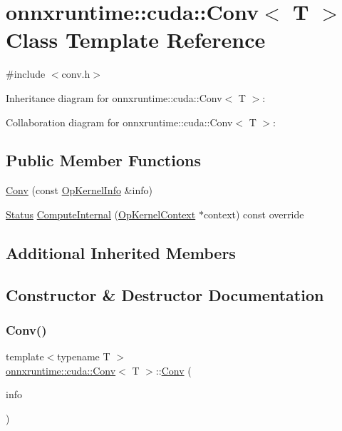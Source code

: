 \hypertarget{classonnxruntime_1_1cuda_1_1Conv}{}\section{onnxruntime\+:\+:cuda\+:\+:Conv$<$ T $>$ Class Template Reference}
\label{classonnxruntime_1_1cuda_1_1Conv}


{\ttfamily \#include $<$conv.\+h$>$}



Inheritance diagram for onnxruntime\+:\+:cuda\+:\+:Conv$<$ T $>$\+:


Collaboration diagram for onnxruntime\+:\+:cuda\+:\+:Conv$<$ T $>$\+:
\subsection*{Public Member Functions}
\begin{DoxyCompactItemize}
\item 
\mbox{\hyperlink{classonnxruntime_1_1cuda_1_1Conv_abd46baacce418318b12d2004d2658a7b}{Conv}} (const \mbox{\hyperlink{classonnxruntime_1_1OpKernelInfo}{Op\+Kernel\+Info}} \&info)
\item 
\mbox{\hyperlink{classonnxruntime_1_1common_1_1Status}{Status}} \mbox{\hyperlink{classonnxruntime_1_1cuda_1_1Conv_a01a9b9a3a511fe197e7bb92685f50e8e}{Compute\+Internal}} (\mbox{\hyperlink{classonnxruntime_1_1OpKernelContext}{Op\+Kernel\+Context}} $\ast$context) const override
\end{DoxyCompactItemize}
\subsection*{Additional Inherited Members}


\subsection{Constructor \& Destructor Documentation}
\mbox{\label{classonnxruntime_1_1cuda_1_1Conv_abd46baacce418318b12d2004d2658a7b}} 
\subsubsection{\texorpdfstring{Conv()}{Conv()}}
{\footnotesize\ttfamily template$<$typename T $>$ \\
\mbox{\hyperlink{classonnxruntime_1_1cuda_1_1Conv}{onnxruntime\+::cuda\+::\+Conv}}$<$ T $>$\+::\mbox{\hyperlink{classonnxruntime_1_1cuda_1_1Conv}{Conv}} (\begin{DoxyParamCaption}\item[{const \mbox{\hyperlink{classonnxruntime_1_1OpKernelInfo}{Op\+Kernel\+Info}} \&}]{info }\end{DoxyParamCaption})\hspace{0.3cm}{\ttfamily [inline]}}



